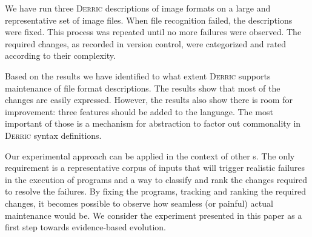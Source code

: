 \documentclass[a4paper]{llncs}
\def\derric{\textsc{Derric}\xspace}
\newcommand{\DSL}{\textsmaller{DSL}\xspace}
\begin{document}
We have run three \derric descriptions of image formats on a large and representative set of image files. 
When file recognition failed, the descriptions were fixed. 
This process was repeated until no more failures were observed. 
The required changes, as recorded in version control, were categorized and rated according to their complexity.

Based on the results we have identified to what extent \derric supports maintenance of file format descriptions. 
The results show that most of the changes are easily expressed.
However, the results also show there is room for improvement: three features should be added to the language. 
The most important of those is a mechanism for abstraction to factor out commonality in \derric syntax definitions.

Our experimental approach can be applied in the context of other \DSL{}s. 
The only requirement is a representative corpus of inputs that will trigger realistic failures in the execution of \DSL programs and a way to classify and rank the changes required to resolve the failures.
By fixing the \DSL programs, tracking and ranking the required changes, it becomes possible to observe how seamless (or painful) actual maintenance would be.
We consider the experiment presented in this paper as a first step towards evidence-based \DSL evolution.



\end{document}
